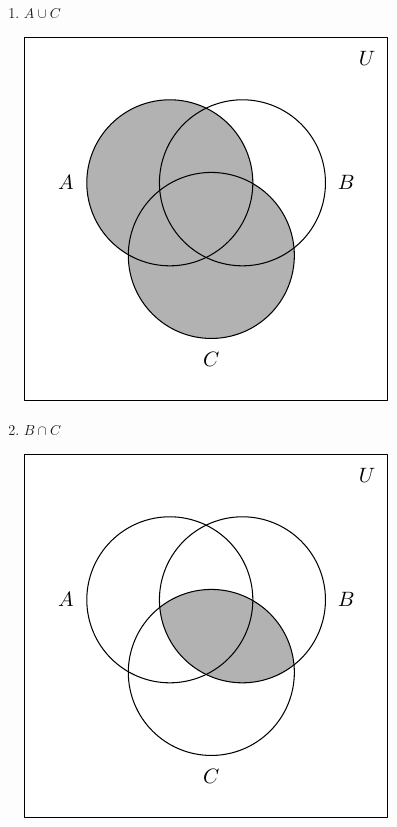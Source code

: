 \documentclass[11pt]{article}
\theoremstyle{definition}  %
\newcounter{HW}
\begin{document}
\begin{multicols}{2}
\begin{enumerate}
\setcounter{enumi}{\value{HW}}

\item $A \cup C$

\includegraphics{SetTheory-40}

\item $B \cap C$

\includegraphics{SetTheory-41}



\setcounter{HW}{\value{enumi}}
\end{enumerate}
\end{multicols}

\pagebreak
\end{document}
